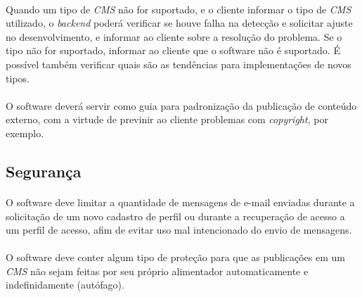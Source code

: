 \documentclass[a4paper,12pt]{article}
\def\cms{\emph{CMS}}
\begin{document}
\paragraph{}
Quando um tipo de \cms{} não for suportado, e o cliente informar o tipo de \cms{} utilizado, o \emph{backend} poderá verificar se houve falha na detecção e solicitar ajuste no desenvolvimento, e informar ao cliente sobre a resolução do problema. Se o tipo não for suportado, informar ao cliente que o software não é suportado. É possível também verificar quais são as tendências para implementações de novos tipos.
\paragraph{}
O software deverá servir como guia para padronização da publicação de conteúdo externo, com a virtude de previnir ao cliente problemas com \emph{copyright}, por exemplo.

\subsection{Segurança}

\paragraph{}
O software deve limitar a quantidade de mensagens de e-mail enviadas durante a solicitação de um novo cadastro de perfil ou durante a recuperação de acesso a um perfil de acesso, afim de evitar uso mal intencionado do envio de mensagens.
\paragraph{}
O software deve conter algum tipo de proteção para que as publicações em um \cms{} não sejam feitas por seu próprio alimentador automaticamente e indefinidamente (autófago).
\end{document}

